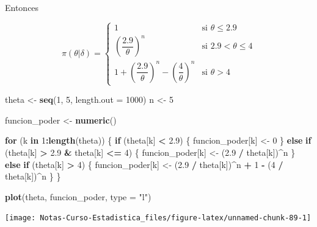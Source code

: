 \documentclass[
  12pt,
]{book}
\newenvironment{Shaded}{\begin{snugshade}}{\end{snugshade}}
\newcommand{\ControlFlowTok}[1]{\textcolor[rgb]{0.13,0.29,0.53}{\textbf{#1}}}
\newcommand{\DataTypeTok}[1]{\textcolor[rgb]{0.13,0.29,0.53}{#1}}
\newcommand{\DecValTok}[1]{\textcolor[rgb]{0.00,0.00,0.81}{#1}}
\newcommand{\FloatTok}[1]{\textcolor[rgb]{0.00,0.00,0.81}{#1}}
\newcommand{\KeywordTok}[1]{\textcolor[rgb]{0.13,0.29,0.53}{\textbf{#1}}}
\newcommand{\NormalTok}[1]{#1}
\newcommand{\OperatorTok}[1]{\textcolor[rgb]{0.81,0.36,0.00}{\textbf{#1}}}
\newcommand{\StringTok}[1]{\textcolor[rgb]{0.31,0.60,0.02}{#1}}
\begin{document}
Entonces

\[
\pi(\theta|\delta) = \begin{cases}1 & \text{si } \theta\leq 2.9 \\
\left(\dfrac{2.9}{\theta}\right)^n& \text{si } 2.9 <\theta\leq 4\\
1+\left(\dfrac{2.9}\theta\right)^n-\left(\dfrac{4}\theta\right)^n & \text{si } \theta >4\end{cases}
\]

\begin{Shaded}
\begin{Highlighting}[]
\NormalTok{theta \textless{}{-}}\StringTok{ }\KeywordTok{seq}\NormalTok{(}\DecValTok{1}\NormalTok{, }\DecValTok{5}\NormalTok{, }\DataTypeTok{length.out =} \DecValTok{1000}\NormalTok{)}
\NormalTok{n \textless{}{-}}\StringTok{ }\DecValTok{5}

\NormalTok{funcion\_poder \textless{}{-}}\StringTok{ }\KeywordTok{numeric}\NormalTok{()}

\ControlFlowTok{for}\NormalTok{ (k }\ControlFlowTok{in} \DecValTok{1}\OperatorTok{:}\KeywordTok{length}\NormalTok{(theta)) \{}
  \ControlFlowTok{if}\NormalTok{ (theta[k] }\OperatorTok{\textless{}}\StringTok{ }\FloatTok{2.9}\NormalTok{) \{}
\NormalTok{    funcion\_poder[k] \textless{}{-}}\StringTok{ }\DecValTok{0}
\NormalTok{  \} }\ControlFlowTok{else} \ControlFlowTok{if}\NormalTok{ (theta[k] }\OperatorTok{\textgreater{}}\StringTok{ }\FloatTok{2.9} \OperatorTok{\&}\StringTok{ }\NormalTok{theta[k] }\OperatorTok{\textless{}=}\StringTok{ }\DecValTok{4}\NormalTok{) \{}
\NormalTok{    funcion\_poder[k] \textless{}{-}}\StringTok{ }\NormalTok{(}\FloatTok{2.9} \OperatorTok{/}\StringTok{ }\NormalTok{theta[k])}\OperatorTok{\^{}}\NormalTok{n}
\NormalTok{  \} }\ControlFlowTok{else} \ControlFlowTok{if}\NormalTok{ (theta[k] }\OperatorTok{\textgreater{}}\StringTok{ }\DecValTok{4}\NormalTok{) \{}
\NormalTok{    funcion\_poder[k] \textless{}{-}}\StringTok{ }\NormalTok{(}\FloatTok{2.9} \OperatorTok{/}\StringTok{ }\NormalTok{theta[k])}\OperatorTok{\^{}}\NormalTok{n }\OperatorTok{+}\StringTok{ }\DecValTok{1} \OperatorTok{{-}}\StringTok{ }\NormalTok{(}\DecValTok{4} \OperatorTok{/}\StringTok{ }\NormalTok{theta[k])}\OperatorTok{\^{}}\NormalTok{n}
\NormalTok{  \}}
\NormalTok{\}}

\KeywordTok{plot}\NormalTok{(theta, funcion\_poder, }\DataTypeTok{type =} \StringTok{"l"}\NormalTok{)}
\end{Highlighting}
\end{Shaded}

\begin{center}\texttt{[image: Notas-Curso-Estadistica\_files/figure-latex/unnamed-chunk-89-1]} \end{center}
\end{document}
